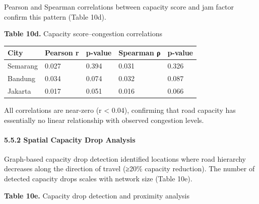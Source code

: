 \documentclass[
  12pt,
]{article}
\begin{document}
Pearson and Spearman correlations between capacity score and jam factor confirm this pattern (Table 10d).

\textbf{Table 10d.} Capacity score--congestion correlations

\begin{longtable}[]{@{}lllll@{}}
\toprule\noalign{}
City & Pearson r & p-value & Spearman ρ & p-value \\
\midrule\noalign{}
\endhead
\bottomrule\noalign{}
\endlastfoot
Semarang & 0.027 & 0.394 & 0.031 & 0.326 \\
Bandung & 0.034 & 0.074 & 0.032 & 0.087 \\
Jakarta & 0.017 & 0.051 & 0.016 & 0.066 \\
\end{longtable}

All correlations are near-zero (r \textless{} 0.04), confirming that road capacity has essentially no linear relationship with observed congestion levels.

\paragraph{5.5.2 Spatial Capacity Drop Analysis}\label{spatial-capacity-drop-analysis}

Graph-based capacity drop detection identified locations where road hierarchy decreases along the direction of travel (≥20\% capacity reduction). The number of detected capacity drops scales with network size (Table 10e).

\textbf{Table 10e.} Capacity drop detection and proximity analysis
\end{document}
